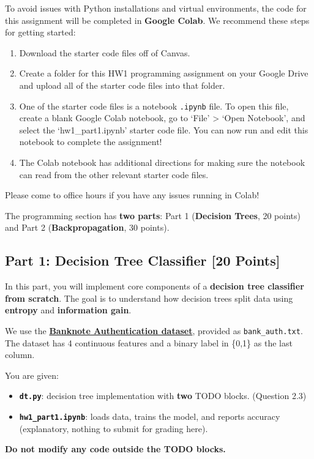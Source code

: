 \documentclass{homework}
\begin{document}
To avoid issues with Python installations and virtual environments, the code for this assignment will be completed in \textbf{Google Colab}. 
We recommend these steps for getting started:
\begin{enumerate}[(1)]
    \item Download the starter code files off of Canvas.
    \item Create a folder for this HW1 programming assignment on your Google Drive and upload all of the starter code files into that folder.
    \item One of the starter code files is a notebook \texttt{.ipynb} file. To open this file, create a blank Google Colab notebook, go to `File' > `Open Notebook', and select the `hw1\_part1.ipynb' starter code file. You can now run and edit this notebook to complete the assignment!
    \item The Colab notebook has additional directions for making sure the notebook can read from the other relevant starter code files.
\end{enumerate}
Please come to office hours if you have any issues running in Colab!

The programming section has \textbf{two parts}: Part 1 (\textbf{Decision Trees}, 20 points) and Part 2 (\textbf{Backpropagation}, 30 points).

\subsection{Part 1: Decision Tree Classifier [20 Points]}
In this part, you will implement core components of a \textbf{decision tree classifier from scratch}. The goal is to understand how decision trees split data using \textbf{entropy} and \textbf{information gain}.

We use the \hyperlink{https://archive.ics.uci.edu/dataset/267/banknote+authentication}{\textbf{Banknote Authentication dataset}}, provided as \texttt{bank_auth.txt}.
The dataset has 4 continuous features and a binary label in \{0,1\} as the last column.

You are given:
\begin{itemize}
    \item \textbf{\texttt{dt.py}}: decision tree implementation with \textbf{two} TODO blocks. (Question 2.3)
    \item \textbf{\texttt{hw1\_part1.ipynb}}: loads data, trains the model, and reports accuracy (explanatory, nothing to submit for grading here).
\end{itemize}
\textbf{Do not modify any code outside the TODO blocks.}
\end{document}
